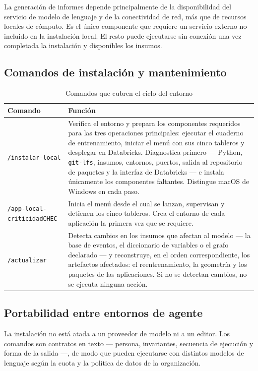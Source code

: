 \documentclass[11pt,a4paper]{article}
\begin{document}
La generación de informes depende principalmente de la disponibilidad del servicio de modelo de
lenguaje y de la conectividad de red, más que de recursos locales de cómputo. Es el único
componente que requiere un servicio externo no incluido en la instalación local. El resto puede
ejecutarse sin conexión una vez completada la instalación y disponibles los insumos.

\subsection{Comandos de instalación y mantenimiento}

\begin{table}[H]
\centering
\caption{Comandos que cubren el ciclo del entorno}
\label{tab:comandosentorno}
\small
\begin{tabularx}{\textwidth}{L{4.4cm} X}
\toprule
\textbf{Comando} & \textbf{Función} \\
\midrule
\texttt{/instalar-local} &
Verifica el entorno y prepara los componentes requeridos para las tres operaciones principales:
ejecutar el cuaderno de entrenamiento, iniciar el menú con sus cinco tableros y desplegar en
Databricks. Diagnostica primero --- Python, \texttt{git-lfs}, insumos, entornos, puertos, salida
al repositorio de paquetes y la interfaz de Databricks --- e instala únicamente los componentes
faltantes. Distingue macOS de Windows en cada paso. \\
\addlinespace
\texttt{/app-local-criticidadCHEC} &
Inicia el menú desde el cual se lanzan, supervisan y detienen los cinco tableros. Crea el
entorno de cada aplicación la primera vez que se requiere. \\
\addlinespace
\texttt{/actualizar} &
Detecta cambios en los insumos que afectan al modelo --- la base de eventos, el diccionario de
variables o el grafo declarado --- y reconstruye, en el orden correspondiente, los artefactos
afectados: el reentrenamiento, la geometría y los paquetes de las aplicaciones. Si no se
detectan cambios, no se ejecuta ninguna acción. \\
\bottomrule
\end{tabularx}
\end{table}

\subsection{Portabilidad entre entornos de agente}

La instalación no está atada a un proveedor de modelo ni a un editor. Los comandos son contratos
en texto --- persona, invariantes, secuencia de ejecución y forma de la salida ---, de modo que
pueden ejecutarse con distintos modelos de lenguaje según la cuota y la política de datos de la
organización.
\end{document}
